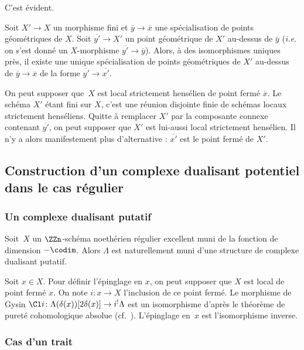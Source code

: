 \documentclass[10pt]{../fichiers-configuration-latex/smfart}
\begin{document}
C'est évident.

\begin{proposition2}\label{17-proposition-specialisation-going-up}
Soit $X'\to X$ un morphisme fini et $\overline y\to\overline x$ une
spécialisation de points géométriques de $X$. Soit $\overline
{y'}\to X'$ un point géométrique de $X'$ au-dessus de $\overline y$
(\emph{i.e.}
on s'est donné un $X$-morphisme $\overline {y'}\to\overline y$). Alors, à
des isomorphismes uniques près, il existe une unique spécialisation
de points géométriques de $X'$ au-dessus de $\overline y\to\overline x$ de
la forme $\overline {y'}\to\overline {x'}$.
\end{proposition2}

On peut supposer que $X$ est local strictement hensélien de point fermé
$\overline x$. Le schéma $X'$ étant fini sur $X$, c'est une réunion disjointe
finie de schémas locaux strictement henséliens. Quitte à remplacer $X'$ par
la composante connexe contenant $\overline {y'}$, on peut supposer que $X'$
est lui-aussi local strictement hensélien. Il n'y a alors manifestement
plus d'alternative : $\overline {x'}$ est le point fermé de $X'$.

\subsection{Construction d'un complexe dualisant potentiel dans le cas régulier}%
\subsubsection{Un complexe dualisant putatif}%
\begin{proposition3}\label{17-proposition-cdputatif-regulier}
Soit $X$ un $\ZZn$-schéma noethérien régulier excellent muni de la fonction de
dimension $-\codim$. Alors $\Lambda$ est naturellement muni d'une structure
de complexe dualisant putatif.
\end{proposition3}

Soit $x\in X$. Pour définir l'épinglage en $x$, on peut supposer que $X$
est local de point fermé $x$. On note $i\colon x\to X$ l'inclusion de ce
point fermé. Le morphisme de Gysin $\Cl i\colon
\Lambda(\delta(x))[2\delta(x)]\to i^!\Lambda$ est un isomorphisme d'après
le théorème de pureté cohomologique absolue
(cf.~). L'épinglage en $x$ est
l'isomorphisme inverse.

\subsubsection{Cas d'un trait}%
\end{document}
